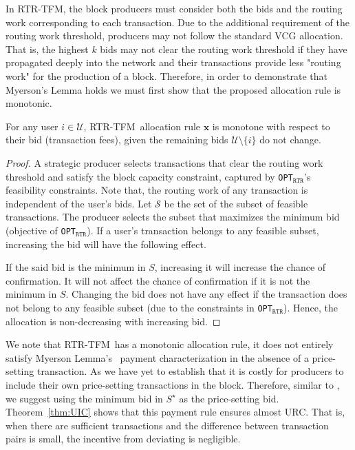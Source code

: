 \documentclass[sigconf,anonymous]{aamas}
\newcommand{\ourTFM}{\textsc{RTR-TFM}}
\newcommand{\ourOPT}{\texttt{OPT$_{\texttt{RTR}}$}}
\begin{document}
In \ourTFM, the block producers must consider both the bids and the routing work corresponding to each transaction. Due to the additional requirement of the routing work threshold, producers may not follow the standard VCG allocation. That is, the highest $k$ bids may not clear the routing work threshold if they have propagated deeply into the network and their transactions provide less "routing work" for the production of a block. Therefore, in order to demonstrate that Myerson's Lemma holds we must first show that the proposed allocation rule is monotonic.

\begin{lemma}\label{lemma:monotone} 
    For any user $i\in \mathcal{U}$, \ourTFM\ allocation rule $\bm{x}$ is monotone with respect to their bid (transaction fees), given the remaining bids $\mathcal{U}\setminus \{i\}$ do not change. 
\end{lemma}
\begin{proof}

A strategic producer selects transactions that clear the routing work threshold and satisfy the block capacity constraint, captured by \ourOPT's feasibility constraints. Note that, the routing work of any transaction is independent of the user's bids. Let $\mathcal{S}$ be the set of the subset of feasible transactions. The producer selects the subset that maximizes the minimum bid (objective of \ourOPT). If a user's transaction belongs to any feasible subset, increasing the bid will have the following effect. 

If the said bid is the minimum in $S$, increasing it will increase the chance of confirmation. It will not affect the chance of confirmation if it is not the minimum in $S$. Changing the bid does not have any effect if the transaction does not belong to any feasible subset (due to the constraints in \ourOPT). Hence, the allocation is non-decreasing with increasing bid.
\end{proof}

We note that \ourTFM\ has a monotonic allocation rule, it does not entirely satisfy Myerson Lemma's~\cite{myerson81} payment characterization in the absence of a price-setting transaction. As we have yet to establish that it is costly for producers to include their own price-setting transactions in the block. Therefore, similar to \citet{roughgarden2021}, we suggest using the minimum bid in $S^\star$ as the price-setting bid. Theorem~\ref{thm:UIC} shows that this payment rule ensures almost URC. That is, when there are sufficient transactions and the difference between transaction pairs is small, the incentive from deviating is negligible.
\end{document}
